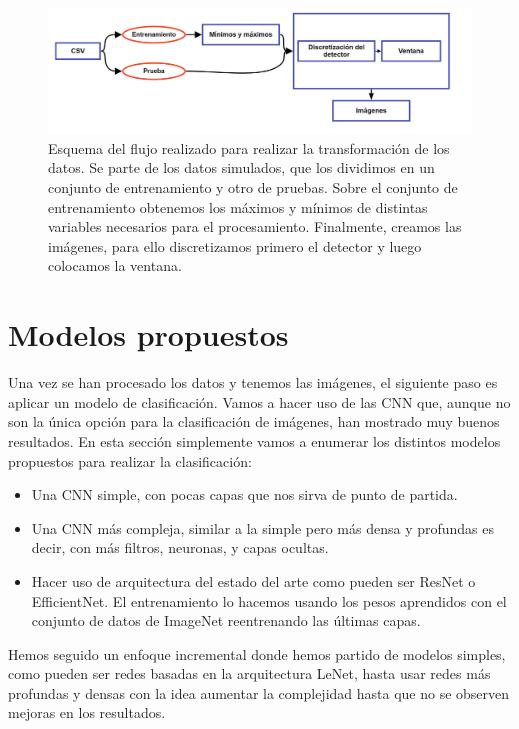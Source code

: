 \documentclass[a4paper,12pt,oneside,titlepage]{book}
\newcommand{\red}[1]{\textcolor{red}{#1}}
\begin{document}
\begin{figure}[h!]
  \centering
  \includegraphics[scale=0.4, center]{flujo2.pdf}
  \caption{Esquema del flujo realizado para realizar la transformación de los datos. Se parte de los datos simulados, que los dividimos en un conjunto de entrenamiento y otro de pruebas. Sobre el conjunto de entrenamiento obtenemos los máximos y mínimos de distintas variables necesarios para el procesamiento. Finalmente, creamos las imágenes, para ello discretizamos primero el detector y luego colocamos la ventana.}
  \label{fig:flujo_data}
\end{figure}

\section{Modelos propuestos}

 
Una vez se han procesado los datos y tenemos las imágenes, el siguiente paso es aplicar un modelo de clasificación. Vamos a hacer uso de las CNN que, aunque no son la única opción para la clasificación de imágenes, han mostrado muy buenos resultados. En esta sección simplemente vamos a enumerar los distintos modelos propuestos para realizar la clasificación:


\begin{itemize}
  \item Una CNN simple, con pocas capas que nos sirva de punto de partida.
  \item Una CNN más compleja, similar a la simple pero más densa y profundas es decir, con más filtros, neuronas, y capas ocultas.
  \item Hacer uso de arquitectura del estado del arte como pueden ser ResNet o EfficientNet. El entrenamiento lo hacemos usando los pesos aprendidos con el conjunto de datos de ImageNet reentrenando las últimas capas.
\end{itemize}

Hemos seguido un enfoque incremental donde hemos partido de modelos simples, como pueden ser redes basadas en la arquitectura LeNet, hasta usar redes más profundas y densas con la idea aumentar la complejidad hasta que no se observen mejoras en los resultados.
\end{document}
